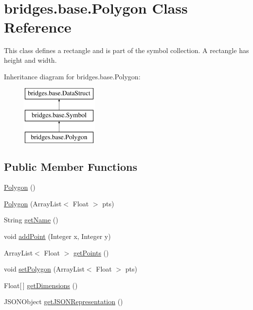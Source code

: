 \hypertarget{classbridges_1_1base_1_1_polygon}{}\section{bridges.\+base.\+Polygon Class Reference}
\label{classbridges_1_1base_1_1_polygon}


This class defines a rectangle and is part of the symbol collection. A rectangle has height and width.  


Inheritance diagram for bridges.\+base.\+Polygon\+:\begin{figure}[H]
\begin{center}
\leavevmode
\includegraphics[height=3.000000cm]{classbridges_1_1base_1_1_polygon}
\end{center}
\end{figure}
\subsection*{Public Member Functions}
\begin{DoxyCompactItemize}
\item 
\hyperlink{classbridges_1_1base_1_1_polygon_af0c1b3bc3147ffbda98fd9c515a8052d}{Polygon} ()
\item 
\hyperlink{classbridges_1_1base_1_1_polygon_a341cc297ba7f0f201d31aa3c98ecf108}{Polygon} (Array\+List$<$ Float $>$ pts)
\item 
String \hyperlink{classbridges_1_1base_1_1_polygon_a2203367acb1a26dfa1a81d69ce61274f}{get\+Name} ()
\item 
void \hyperlink{classbridges_1_1base_1_1_polygon_a23af8508f5ef7c2bbe0784264ee86e16}{add\+Point} (Integer x, Integer y)
\item 
Array\+List$<$ Float $>$ \hyperlink{classbridges_1_1base_1_1_polygon_adf81f52211ad3c2c8318461e199b6df5}{get\+Points} ()
\item 
void \hyperlink{classbridges_1_1base_1_1_polygon_ac92747578a038f747de9b2ccc90dc972}{set\+Polygon} (Array\+List$<$ Float $>$ pts)
\item 
Float\mbox{[}$\,$\mbox{]} \hyperlink{classbridges_1_1base_1_1_polygon_ae6e7440de0d3de9084f924e08f515a67}{get\+Dimensions} ()
\item 
J\+S\+O\+N\+Object \hyperlink{classbridges_1_1base_1_1_polygon_a12489d762f32ce5259ae6640ad95f188}{get\+J\+S\+O\+N\+Representation} ()
\end{DoxyCompactItemize}
